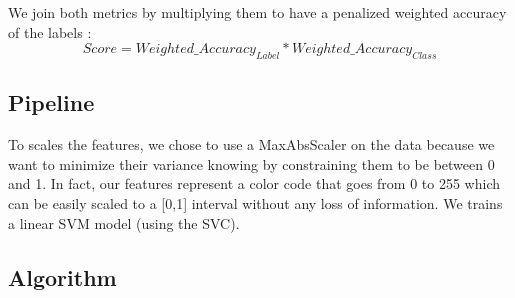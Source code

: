 We join both metrics by multiplying them to have a penalized weighted accuracy of the labels : 
\begin{equation*}
	Score = Weighted\_Accuracy_{Label} *  Weighted\_Accuracy_{Class}
\end{equation*}

\subsection{Pipeline}
To scales the features, we chose to use a MaxAbsScaler on the data because we want to minimize their variance knowing by constraining them to be between 0 and 1. In fact, our features represent a color code that goes from 0 to 255 which can be easily scaled to a [0,1] interval without any loss of information. We trains a linear SVM model (using the SVC). 

\subsection{Algorithm}
